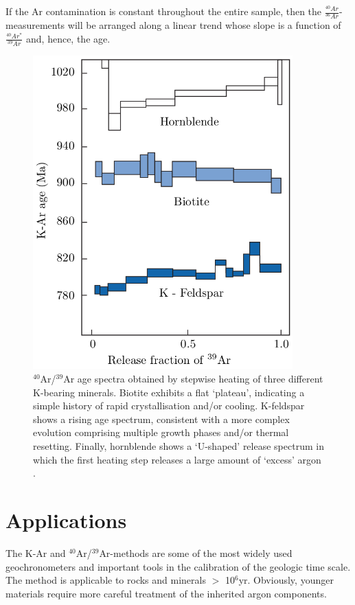 \documentclass{book}
\newif\ifpdf
\begin{document}
If the Ar contamination is constant throughout the entire sample, then
the $\frac{^{40}Ar}{^{36}Ar}$-measurements will be arranged along a
linear trend whose slope is a function of $\frac{^{40}Ar^*}{^{39}Ar}$
and, hence, the age.

\begin{figure}[!ht]
  \centering
  \ifpdf
  \def\svgwidth{.7\textwidth}
  
  \else
  \includegraphics[width=10cm]{Ar-Ar.png}
  \fi
  \caption{$^{40}$Ar/$^{39}$Ar age spectra obtained by stepwise
    heating of three different K-bearing minerals. Biotite exhibits a
    flat `plateau', indicating a simple history of rapid
    crystallisation and/or cooling. K-feldspar shows a rising age
    spectrum, consistent with a more complex evolution comprising
    multiple growth phases and/or thermal resetting. Finally,
    hornblende shows a `U-shaped' release spectrum in which the first
    heating step releases a large amount of `excess' argon
    \citep[modified from][]{allegre2008}.}
  \label{fig:Ar-Ar}
\end{figure}

\section{Applications}
\label{sec:Ar-applications}

The K-Ar and $^{40}$Ar/$^{39}$Ar-methods are some of the most widely
used geochronometers and important tools in the calibration of the
geologic time scale. The method is applicable to rocks and minerals
$>$ 10$^6$yr. Obviously, younger materials require more careful
treatment of the inherited argon components.
\end{document}
